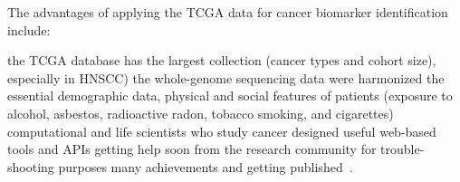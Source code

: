 \documentclass[
paper=landscape,
paper=160mm:90mm, %
fontsize=11pt, %
pagesize, %
parskip=half-, %
]{scrartcl} %
\theoremstyle{mythmstyle} %
\begin{document}
\clearpage

The advantages of applying the TCGA data for cancer biomarker identification include:
\begin{outline}
\1  the TCGA database has the largest collection (cancer types and cohort size), especially in HNSCC)
\2 the whole-genome sequencing data were harmonized
\2 the essential demographic data, physical and social features of patients (exposure to alcohol, asbestos, radioactive radon, tobacco smoking, and cigarettes)
\2 computational and life scientists who study cancer designed useful web-based tools and APIs
\1 getting help soon from the research community for trouble-shooting purposes
\1 many achievements and getting published~\cite{Tomczak2015}.
\end{outline}

\clearpage
\end{document}
